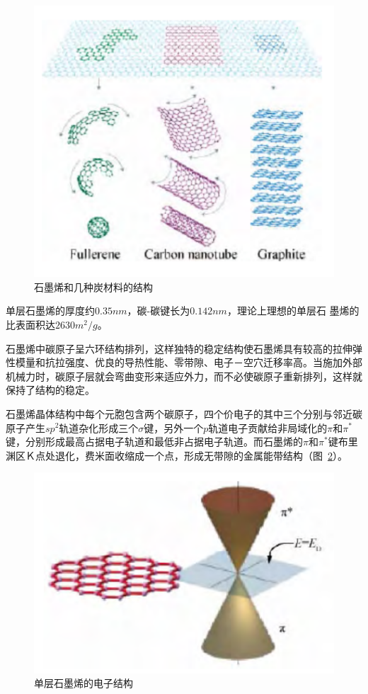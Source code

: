\begin{figure}
    \centering
    \includegraphics{img/石墨烯和几种炭材料的结构.png}
    \caption{石墨烯和几种炭材料的结构}
    \label{fig:grapheneStructure}
\end{figure}

单层石墨烯的厚度约$0.35nm$，碳-碳键长为$0.142nm$，理论上理想的单层石 墨烯的比表面积达$2630m^{2}/g$。

石墨烯中碳原子呈六环结构排列，这样独特的稳定结构使石墨烯具有较高的拉伸弹性模量和抗拉强度、优良的导热性能、零带隙、电子－空穴迁移率高。当施加外部机械力时，碳原子层就会弯曲变形来适应外力，而不必使碳原子重新排列，这样就保持了结构的稳定。

石墨烯晶体结构中每个元胞包含两个碳原子，四个价电子的其中三个分别与邻近碳原子产生$sp^{2}$轨道杂化形成三个$\sigma$键，另外一个$p$轨道电子贡献给非局域化的$\pi$和$\pi^{*}$键，分别形成最高占据电子轨道和最低非占据电子轨道。而石墨烯的$\pi$和$\pi^{*}$键布里渊区Ｋ点处退化，费米面收缩成一个点，形成无带隙的金属能带结构（图~\ref{fig:grapheneElectrical}）。

\begin{figure}
    \centering
    \includegraphics[scale=0.6]{img/单层石墨烯的电子结构.png}
    \caption{单层石墨烯的电子结构}
    \label{fig:grapheneElectrical}
\end{figure}